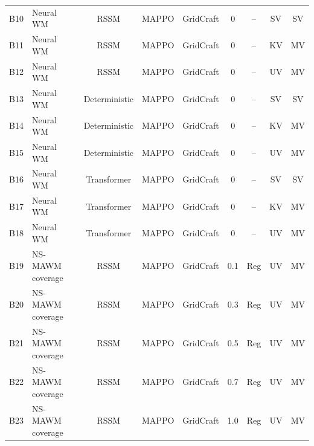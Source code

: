\documentclass{article}
\theoremstyle{plain}
\theoremstyle{definition}
\theoremstyle{remark}
\begin{document}
\begin{table}[h!]
{\begin{tabular}{llccccccc}
      B10           & Neural WM               &
      RSSM          & MAPPO                   & GridCraft      & 0   & --       & SV & SV \\
      B11           & Neural WM               &
      RSSM          & MAPPO                   & GridCraft      & 0   & --       & KV & MV \\
      B12           & Neural WM               &
      RSSM          & MAPPO                   & GridCraft      & 0   & --       & UV & MV \\

      B13           & Neural WM               &
      Deterministic & MAPPO                   & GridCraft      & 0   & --       & SV & SV \\
      B14           & Neural WM               &
      Deterministic & MAPPO                   & GridCraft      & 0   & --       & KV & MV \\
      B15           & Neural WM               &
      Deterministic & MAPPO                   & GridCraft      & 0   & --       & UV & MV \\

      B16           & Neural WM               &
      Transformer   & MAPPO                   & GridCraft      & 0   & --       & SV & SV \\
      B17           & Neural WM               &
      Transformer   & MAPPO                   & GridCraft      & 0   & --       & KV & MV \\
      B18           & Neural WM               &
      Transformer   & MAPPO                   & GridCraft      & 0   & --       & UV & MV \\

      \midrule

      B19           & NS-MAWM coverage        &
      RSSM          & MAPPO                   & GridCraft      & 0.1 & Reg      & UV & MV \\
      B20           & NS-MAWM coverage        &
      RSSM          & MAPPO                   & GridCraft      & 0.3 & Reg      & UV & MV \\
      B21           & NS-MAWM coverage        &
      RSSM          & MAPPO                   & GridCraft      & 0.5 & Reg      & UV & MV \\
      B22           & NS-MAWM coverage        &
      RSSM          & MAPPO                   & GridCraft      & 0.7 & Reg      & UV & MV \\
      B23           & NS-MAWM coverage        &
      RSSM          & MAPPO                   & GridCraft      & 1.0 & Reg      & UV & MV \\


\end{tabular}}
\end{table}
\end{document}
